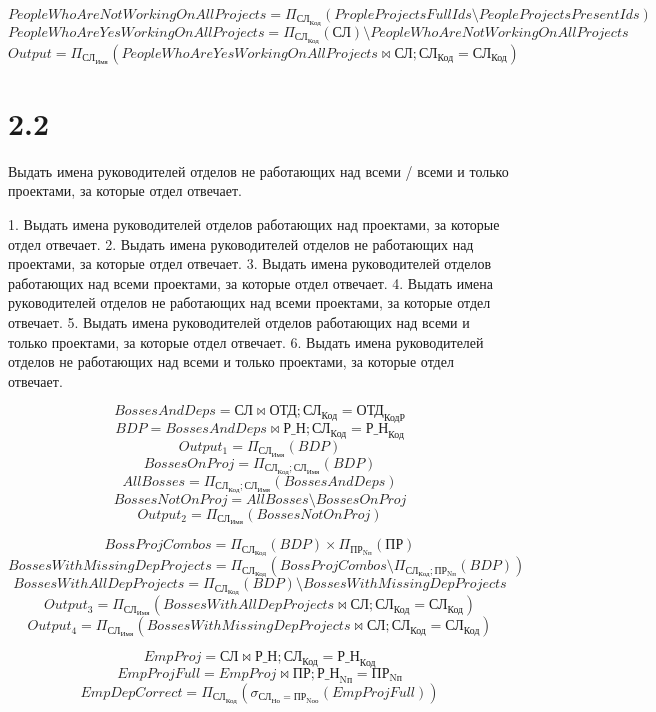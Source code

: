 \documentclass{article}
\newcommand{\employee}{\textbf{СЛ}}
\newcommand{\department}{\textbf{ОТД}}
\newcommand{\project}{\textbf{ПР}}
\newcommand{\workson}{\textbf{Р\_Н}}
\newcommand{\employeeName}{\textbf{СЛ}_\text{Имя}}
\newcommand{\employeeId}{\textbf{СЛ}_\text{Код}}
\newcommand{\employeeDepId}{\textbf{СЛ}_\text{Но}}
\newcommand{\departmentBossId}{\textbf{ОТД}_\text{КодР}}
\newcommand{\projectId}{\textbf{ПР}_\text{Nп}}
\newcommand{\projectResponsibleDepId}{\textbf{ПР}_\text{Nоо}}
\newcommand{\worksonEmpId}{\textbf{Р\_Н}_\text{Код}}
\newcommand{\worksonProjId}{\textbf{Р\_Н}_\text{Nп}}
\newcommand{\filter}[2]{\sigma{}_{#1} \left( #2 \right)}
\newcommand{\join}[3]{ #1 \bowtie #2; #3 }
\newcommand{\select}[2]{\Pi_{#1}\left( #2 \right)}
\begin{document}
$$ PeopleWhoAreNotWorkingOnAllProjects = \select{\employeeId}{PropleProjectsFullIds \setminus PeopleProjectsPresentIds}$$
$$ PeopleWhoAreYesWorkingOnAllProjects = \select{\employeeId}{\employee} \setminus PeopleWhoAreNotWorkingOnAllProjects$$
$$ Output = \select{\employeeName}{\join{PeopleWhoAreYesWorkingOnAllProjects}{\employee}{\employeeId = \employeeId}}$$


\section{2.2}

Выдать имена руководителей отделов {не} работающих над {всеми / всеми и только} проектами, за которые отдел отвечает.

1. Выдать имена руководителей отделов работающих над проектами, за которые отдел отвечает.
2. Выдать имена руководителей отделов не работающих над проектами, за которые отдел отвечает.
3. Выдать имена руководителей отделов работающих над всеми проектами, за которые отдел отвечает.
4. Выдать имена руководителей отделов не работающих над всеми проектами, за которые отдел отвечает.
5. Выдать имена руководителей отделов работающих над всеми и только проектами, за которые отдел отвечает.
6. Выдать имена руководителей отделов не работающих над всеми и только проектами, за которые отдел отвечает.

$$ BossesAndDeps = \join{\employee}{\department}{\employeeId = \departmentBossId}$$
$$ BDP = \join{BossesAndDeps}{\workson}{\employeeId = \worksonEmpId}$$
$$ Output_1 = \select{\employeeName}{BDP} $$
$$ BossesOnProj = \select{\employeeId; \employeeName}{BDP}$$
$$ AllBosses = \select{\employeeId; \employeeName}{BossesAndDeps}$$
$$ BossesNotOnProj = AllBosses \setminus BossesOnProj$$
$$ Output_2 = \select{\employeeName}{BossesNotOnProj}$$

$$ BossProjCombos = \select{\employeeId}{BDP} \times \select{\projectId}{\project}$$
$$ BossesWithMissingDepProjects = \select{\employeeId}{BossProjCombos \setminus \select{\employeeId; \projectId}{BDP}}$$
$$ BossesWithAllDepProjects = \select{\employeeId}{BDP} \setminus BossesWithMissingDepProjects$$
$$ Output_3 = \select{\employeeName}{\join{BossesWithAllDepProjects}{\employee}{\employeeId=\employeeId}}$$
$$ Output_4 = \select{\employeeName}{\join{BossesWithMissingDepProjects}{\employee}{\employeeId=\employeeId}}$$

$$ EmpProj = \join{\employee}{\workson}{\employeeId = \worksonEmpId}$$
$$ EmpProjFull = \join{EmpProj}{\project}{\worksonProjId = \projectId}$$
$$ EmpDepCorrect = \select{\employeeId}{\filter{\employeeDepId = \projectResponsibleDepId}{EmpProjFull}}$$
\end{document}
